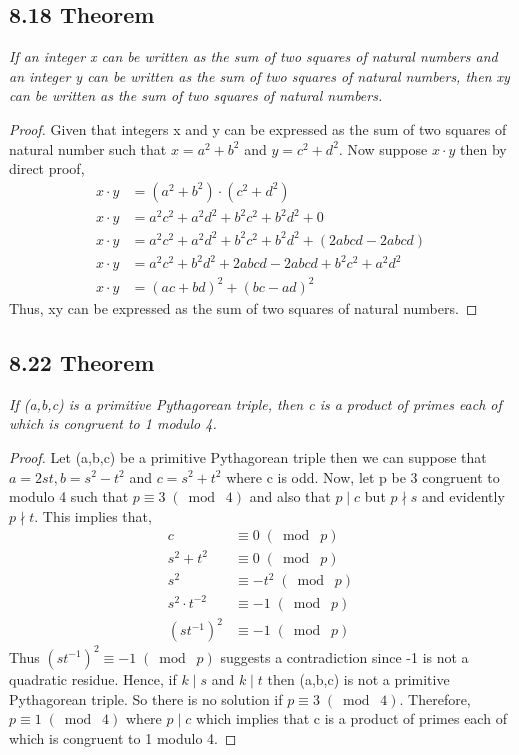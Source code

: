 \documentclass{article}
\begin{document}
\subsection*{8.18 Theorem} 
\quad \textit{If an integer x can be written as the sum of two squares of natural numbers and an integer y can be written as the sum of two squares of natural numbers, then xy can be written as the sum of two squares of natural numbers.}

\begin{proof}
Given that integers x and y can be expressed as the sum of two squares of natural number such that $x = a^2 + b^2$ and $y = c^2 + d^2$. Now suppose $x \cdot y$ then by direct proof,
\begin{align*}
    &&x \cdot y &= (a^2 + b^2) \cdot (c^2 + d^2) &&\\
    &&x \cdot y &= a^2c^2 + a^2d^2 + b^2c^2 + b^2d^2 + 0 &&\\
    &&x \cdot y &= a^2c^2 + a^2d^2 + b^2c^2 + b^2d^2 + (2abcd - 2abcd) &&\\
    &&x \cdot y &= a^2c^2 + b^2d^2 + 2abcd - 2abcd + b^2c^2 + a^2d^2 &&\\
    &&x \cdot y &= (ac + bd)^2 + (bc - ad)^2 &&
\end{align*}
Thus, xy can be expressed as the sum of two squares of natural numbers.
\end{proof}

\subsection*{8.22 Theorem} 
\quad \textit{If (a,b,c) is a primitive Pythagorean triple, then c is a product of primes each of which is congruent to 1 modulo 4.}

\begin{proof}
Let (a,b,c) be a primitive Pythagorean triple then we can suppose that $a = 2st, b = s^2 - t^2$ and $c = s^2 + t^2$ where c is odd. Now, let p be 3 congruent to modulo 4 such that $p \equiv 3 \;(\bmod\; 4)$ and also that $p \mid c$ but $p \nmid s$ and evidently $p \nmid t$. This implies that,
\begin{align*}
    &&c &\equiv 0 \;(\bmod\; p)&&\\
    &&s^2 + t^2 &\equiv 0 \;(\bmod\; p)&&\\
    &&s^2 &\equiv -t^2 \;(\bmod\; p)&&\\
    &&s^2 \cdot t^{-2} &\equiv -1 \;(\bmod\; p)&&\\
    &&(st^{-1})^2 &\equiv -1 \;(\bmod\; p)&&
\end{align*}
Thus $(st^{-1})^2 \equiv -1 \;(\bmod\; p)$ suggests a contradiction since -1 is not a quadratic residue.  Hence, if $k \mid s$ and $k \mid t$ then (a,b,c) is not a primitive Pythagorean triple. So there is no solution if $p \equiv 3 \;(\bmod\; 4)$. Therefore, $p \equiv 1 \;(\bmod\; 4)$ where $p \mid c$ which implies that c is a product of primes each of which is congruent to 1 modulo 4.                 
\end{proof}
\end{document}
